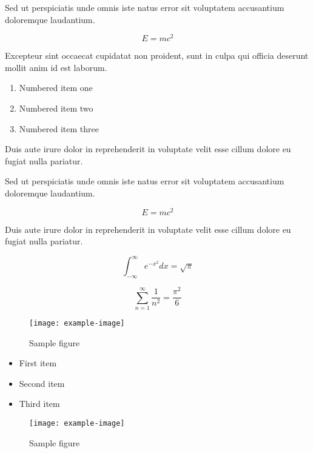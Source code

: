 \documentclass{article}
\begin{document}
Sed ut perspiciatis unde omnis iste natus error sit voluptatem accusantium doloremque laudantium.

\begin{equation}
    E = mc^2
\end{equation}


Excepteur sint occaecat cupidatat non proident, sunt in culpa qui officia deserunt mollit anim id est laborum.


\begin{enumerate}
\item Numbered item one
\item Numbered item two
\item Numbered item three
\end{enumerate}

Duis aute irure dolor in reprehenderit in voluptate velit esse cillum dolore eu fugiat nulla pariatur.

Sed ut perspiciatis unde omnis iste natus error sit voluptatem accusantium doloremque laudantium.


\begin{equation}
    E = mc^2
\end{equation}

Duis aute irure dolor in reprehenderit in voluptate velit esse cillum dolore eu fugiat nulla pariatur.

\begin{equation}
    \int_{-\infty}^{\infty} e^{-x^2} dx = \sqrt{\pi}
\end{equation}

\begin{equation}
    \sum_{n=1}^{\infty} \frac{1}{n^2} = \frac{\pi^2}{6}
\end{equation}


\begin{figure}[h]
    \centering
    \texttt{[image: example-image]}
    \caption{Sample figure}
    \label{fig:sample}
\end{figure}


\begin{itemize}
\item First item
\item Second item
\item Third item
\end{itemize}

\begin{figure}[h]
    \centering
    \texttt{[image: example-image]}
    \caption{Sample figure}
    \label{fig:sample}
\end{figure}
\end{document}
